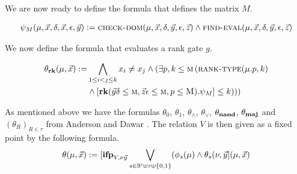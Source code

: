\documentclass[../paper.tex]{subfiles}
\begin{document}
				
We are now ready to define the formula that defines the matrix $M$.
				
\begin{align*}
	\psi_M (\mu, \vec{x}, \delta, \vec{x}, \epsilon, \vec{y}) :=  \textsc{check-dom}(\mu, \vec{x}, \delta, \vec{y}, \epsilon, \vec{z}) \land \textsc{find-eval} (\mu, \vec{x}, \delta, \vec{y}, \epsilon, \vec{z}) 
\end{align*}
				
We now define the formula that evaluates a rank gate $g$.
				
\begin{align*}
	\theta_{\text{\textbf{rk}}} (\mu, \vec{x}) := & \bigwedge_{1 \leq i < j \leq k} x_i \neq x_j \land (\exists p, k \leq \textsc{m} \, (\textsc{rank-type}(\mu. p, k) \\ &\land [\text{\textbf{rk}} (\vec{y}\delta\leq \textsc{m}, \vec{z}\epsilon\leq \textsc{m}, p \leq \textsc{M}). \psi_M] \leq k )))
\end{align*}
				
As mentioned above we have the formulas $\theta_0$, $\theta_1$, $\theta_\land$,
$\theta_\lor$, $\theta_{\text{\textbf{nand}}}$, $\theta_{\text{\textbf{maj}}}$ and $(\theta_R)_{R \in \tau}$ from
Anderson and Dawar \cite{AndersonD17}. The relation $V$ is then given as a fixed
point by the following formula.
\begin{align*}
	\theta (\mu, \vec{x}) := [\text{\textbf{ifp}}_{V,\nu \vec{y}} \bigvee_{s \in \mathbb{B}' \uplus \tau \uplus \{0,1\}} (\phi_s(\mu) \land \theta_s (\nu, \vec{y} ] (\mu, \vec{x}) 
\end{align*}
				
\end{document}
